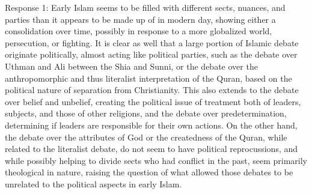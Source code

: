 \documentclass[11 pt, twoside]{article}
\begin{document}
Response 1:
	Early Islam seems to be filled with different sects, nuances, and parties than it appears to be made up of in modern day, showing either a consolidation over time, possibly in response to a more globalized world, persecution, or fighting. It is clear as well that a large portion of Islamic debate originate politically, almost acting like political parties, such as the debate over Uthman and Ali between the Shia and Sunni, or the debate over the anthropomorphic and thus literalist interpretation of the Quran, based on the political nature of separation from Christianity. This also extends to the debate over belief and unbelief, creating the political issue of treatment both of leaders, subjects, and those of other religions, and the debate over predetermination, determining if leaders are responsible for their own actions. On the other hand, the debate over the attributes of God or the createdness of the Quran, while related to the literalist debate, do not seem to have political reprocussions, and while possibly helping to divide sects who had conflict in the past, seem primarily theological in nature, raising the question of what allowed those debates to be unrelated to the political aspects in early Islam.
\end{document}

